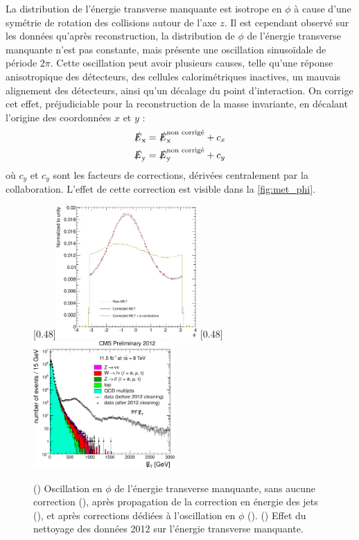 \medskip

La distribution de l'énergie transverse manquante est isotrope en $\phi$ à cause d'une symétrie de rotation des collisions autour de l'axe $z$. Il est cependant observé sur les données qu'après reconstruction, la distribution de $\phi$ de l'énergie transverse manquante n'est pas constante, mais présente une oscillation sinusoïdale de période \tilde$\num{2}\pi$. Cette oscillation peut avoir plusieurs causes, telle qu'une réponse anisotropique des détecteurs, des cellules calorimétriques inactives, un mauvais alignement des détecteurs, ainsi qu'un décalage du point d'interaction. On corrige cet effet, préjudiciable pour la reconstruction de la masse invariante, en décalant l'origine des coordonnées $x$ et $y$ :
\begin{align*}
  \slashed{E}_{\mathrm{x}} &= \slashed{E}_{\mathrm{x}}^\text{non corrigé} + c_x\\
  \slashed{E}_{\mathrm{y}} &= \slashed{E}_{\mathrm{y}}^\text{non corrigé} + c_y
\end{align*}
où $c_y$ et $c_y$ sont les facteurs de corrections, dérivées centralement par la collaboration. L'effet de cette correction est visible dans la \cref{fig:met_phi}.

\bigskip

\begin{figure}[tbp] \centering
    \subcaptionbox{\label{fig:met_phi}}[0.48\textwidth]{\includegraphics[width=0.48\textwidth]{chapitre7/figs/met_phi_corrections.pdf}}
    \subcaptionbox{\label{fig:met_cleaning}}[0.48\textwidth]{\includegraphics[width=0.48\textwidth]{chapitre7/figs/met_cleaning.pdf}}
    \caption{() Oscillation en $\phi$ de l'énergie transverse manquante, sans aucune correction (\rouge), après propagation de la correction en énergie des jets (\violet), et après corrections dédiées à l'oscillation en $\phi$ (\vertc). () Effet du nettoyage des données 2012 sur l'énergie transverse manquante.}
\end{figure}

